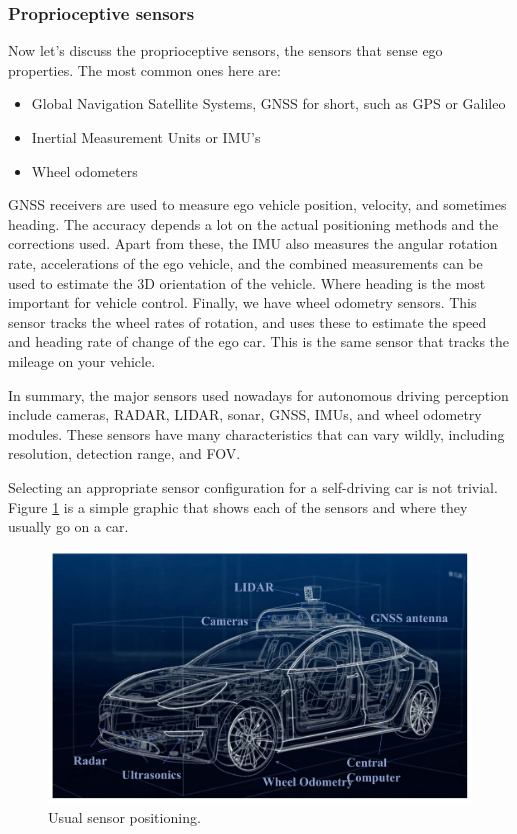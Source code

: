 \subsubsection{Proprioceptive sensors}

Now let's discuss the proprioceptive sensors, the sensors that sense ego properties. The most common ones here
are:

\begin{itemize}
\item Global Navigation Satellite Systems, GNSS for short, such as GPS or Galileo
\item Inertial Measurement Units or IMU's
\item Wheel odometers
\end{itemize}

GNSS receivers are used to measure ego vehicle position, velocity, and sometimes heading. The accuracy depends a lot on
the actual positioning methods and the corrections used. Apart from these, the IMU also
measures the angular rotation rate, accelerations of the ego vehicle, and
the combined measurements can be used to estimate the 3D orientation
of the vehicle. Where heading is the most important for
vehicle control. Finally, we have wheel odometry sensors. This sensor tracks the wheel
rates of rotation, and uses these to estimate the speed and
heading rate of change of the ego car. This is the same sensor that tracks
the mileage on your vehicle. 

In summary, the major sensors used nowadays for autonomous driving perception
include cameras, RADAR, LIDAR, sonar, GNSS, IMUs,
and wheel odometry modules. These sensors have many characteristics that can vary wildly, including resolution,
detection range, and FOV. 

Selecting an appropriate sensor configuration for a self-driving car is not trivial. Figure \ref{sensors_positioning} is a simple graphic that
shows each of the sensors and where they usually go on a car. 

\begin{figure}[!htb]
\begin{center}
\includegraphics[scale=0.280]{img/hardware/sensors_positioning.jpeg}
\end{center}
\caption{Usual sensor positioning.}
\label{sensors_positioning}
\end{figure}


